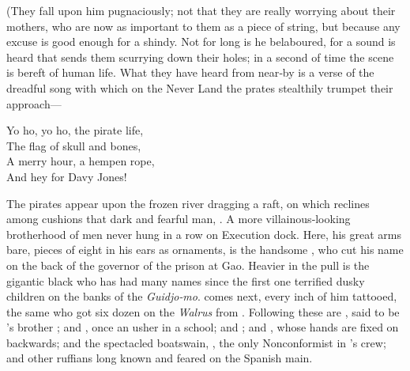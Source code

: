 \begin{stagedir}
(They fall upon him pugnaciously;
not that they are really worrying about their mothers, who are now as important to them as a piece of string,
but because any excuse is good enough for a shindy.
Not for long is he belaboured, for a sound is heard that sends them scurrying down their holes; in a second of time the scene is bereft of human life.
What they have heard from near‐by is a verse of the dreadful song with which on the Never Land the prates stealthily trumpet their approach—

\begin{drama}
\speakercontinues
	Yo ho, yo ho, the pirate life,\\
	The flag of skull and bones,\\
	A merry hour, a hempen rope,\\
	And hey for Davy Jones!
\end{drama}

The pirates appear upon the frozen river dragging a raft,
on which reclines among cushions that dark and fearful man, .
A more villainous‐looking brotherhood of men never hung in a row on Execution dock.
Here, his great arms bare, pieces of eight in his ears as ornaments, is the handsome \cecco, who cut his name on the back of the governor of the prison at Gao.
Heavier in the pull is the gigantic black who has had many names since the first one terrified dusky children on the banks of the \emph{Guidjo‐mo}.
 comes next, every inch of him tattooed, the same \jukes who got six dozen on the \emph{Walrus} from .
Following these are \cookson, said to be ’s brother ;
and , once an usher in a school;
and  ;
and \noodler, whose hands are fixed on backwards;
and the spectacled boatswain, \smee, the only Nonconformist in \hook’s crew;
and other ruffians long known and feared on the Spanish main.


\end{stagedir}
